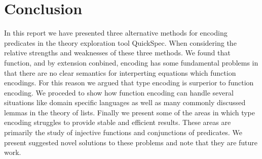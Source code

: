 \section{Conclusion}
In this report we have presented three
alternative methods for encoding predicates
in the theory exploration tool QuickSpec.
When considering the relative strengths and weaknesses
of these three methods. We found that function, and by extension
conbined, encoding has
some fundamental problems in that there are no clear
semantics for interperting equations which function encodings.
For this reason we argued that type encoding is surperior
to function encoding. We proceded to show how function encoding
can handle several situations like domain specific languages
as well as many commonly discussed lemmas in the theory
of lists. Finally we present some of the areas in which
type encoding struggles to provide stable and efficient results.
These areas are primarily the study of injective functions
and conjunctions of predicates. We present suggested novel
solutions to these problems and note that they are future work.
